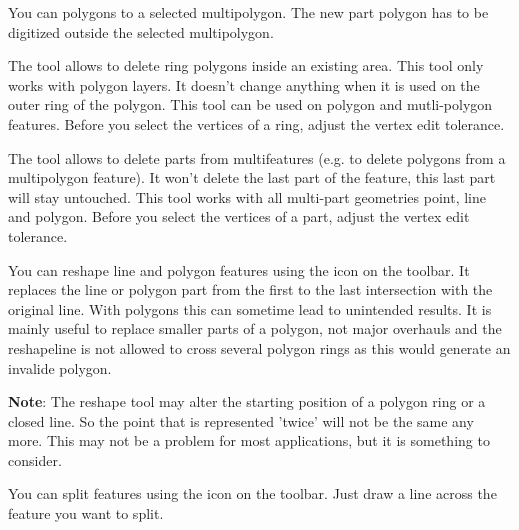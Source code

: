 
You can  polygons to a selected multipolygon. 
The new part polygon has to be digitized outside the selected multipolygon.


The  tool allows to delete ring
polygons inside an existing area. This tool only works with polygon layers. 
It doesn't change anything when it is used on the outer ring of the polygon. 
This tool can be used on polygon and mutli-polygon features. Before
you select the vertices of a ring, adjust the vertex edit tolerance.


The  tool allows to delete parts
from multifeatures (e.g. to delete polygons from a multipolygon feature). It 
won't delete the last part of the feature, this last part will stay untouched. 
This tool works with all multi-part geometries point, line and polygon. Before 
you select the vertices of a part, adjust the vertex edit tolerance. 


You can reshape line and polygon features using the 
 icon on the toolbar. It
replaces the line or polygon part from the first to the last intersection 
with the original line. With polygons this can sometime lead to unintended 
results. It is mainly useful to replace smaller parts of a polygon, not major 
overhauls and the reshapeline is not allowed to cross several polygon rings
as this would generate an invalide polygon.

\textbf{Note}: The reshape tool may alter the starting position of a polygon
ring or a closed line. So the point that is represented 'twice' will not be
the same any more. This may not be a problem for most applications, but it is
something to consider.


You can split features using the  icon on the toolbar. Just draw a line across the feature you 
want to split.


